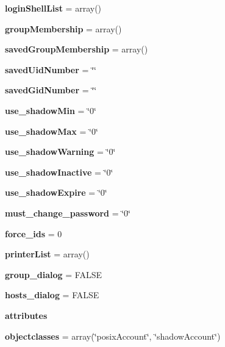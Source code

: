 \begin{CompactItemize}
\item 
{\bf login\-Shell\-List} = array()\label{classposixAccount_o15}

\item 
{\bf group\-Membership} = array()\label{classposixAccount_o16}

\item 
{\bf saved\-Group\-Membership} = array()\label{classposixAccount_o17}

\item 
{\bf saved\-Uid\-Number} = \char`\"{}\char`\"{}\label{classposixAccount_o18}

\item 
{\bf saved\-Gid\-Number} = \char`\"{}\char`\"{}\label{classposixAccount_o19}

\item 
{\bf use\_\-shadow\-Min} = \char`\"{}0\char`\"{}\label{classposixAccount_o20}

\item 
{\bf use\_\-shadow\-Max} = \char`\"{}0\char`\"{}\label{classposixAccount_o21}

\item 
{\bf use\_\-shadow\-Warning} = \char`\"{}0\char`\"{}\label{classposixAccount_o22}

\item 
{\bf use\_\-shadow\-Inactive} = \char`\"{}0\char`\"{}\label{classposixAccount_o23}

\item 
{\bf use\_\-shadow\-Expire} = \char`\"{}0\char`\"{}\label{classposixAccount_o24}

\item 
{\bf must\_\-change\_\-password} = \char`\"{}0\char`\"{}\label{classposixAccount_o25}

\item 
{\bf force\_\-ids} = 0\label{classposixAccount_o26}

\item 
{\bf printer\-List} = array()\label{classposixAccount_o27}

\item 
{\bf group\_\-dialog} = FALSE\label{classposixAccount_o28}

\item 
{\bf hosts\_\-dialog} = FALSE\label{classposixAccount_o29}

\item 
{\bf attributes}
\item 
{\bf objectclasses} = array(\char`\"{}posix\-Account\char`\"{}, \char`\"{}shadow\-Account\char`\"{})\label{classposixAccount_o31}

\end{CompactItemize}


